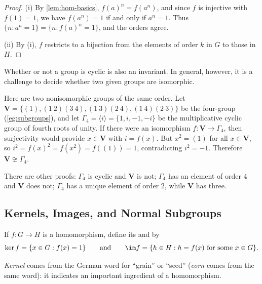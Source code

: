 \begin{proof}
	(i) By \autoref{lem:hom-basics}, \(f(a)^n = f(a^n)\), and since \(f\) is injective
	with \(f(1) = 1\), we have \(f(a^n) = 1\) if and only if \(a^n = 1\). Thus
	\(\{n : a^n = 1\} = \{n : f(a)^n = 1\}\), and the orders agree.

	(ii) By (i), \(f\) restricts to a bijection from the elements of order \(k\) in \(G\) to
	those in \(H\).
\end{proof}

Whether or not a group is cyclic is also an invariant. In general, however, it is a
challenge to decide whether two given groups are isomorphic.

\begin{eg}\label{eg:V-not-Gamma4}
	Here are two nonisomorphic groups of the same order. Let
	\(\mathbf V = \{(1), (1\ 2)(3\ 4), (1\ 3)(2\ 4), (1\ 4)(2\ 3)\}\) be the four-group
	(\autoref{eg:subgroups}), and let \(\Gamma_4 = \langle i\rangle = \{1, i, -1, -i\}\) be
	the multiplicative cyclic group of fourth roots of unity. If there were an isomorphism
	\(f\colon \mathbf V \to \Gamma_4\), then surjectivity would provide \(x \in \mathbf V\)
	with \(i = f(x)\). But \(x^2 = (1)\) for all \(x \in \mathbf V\), so
	\(i^2 = f(x)^2 = f(x^2) = f((1)) = 1\), contradicting \(i^2 = -1\). Therefore
	\(\mathbf V \not\cong \Gamma_4\).

	There are other proofs: \(\Gamma_4\) is cyclic and \(\mathbf V\) is not; \(\Gamma_4\)
	has an element of order \(4\) and \(\mathbf V\) does not; \(\Gamma_4\) has a unique
	element of order \(2\), while \(\mathbf V\) has three.
\end{eg}

\subsection{Kernels, Images, and Normal Subgroups}

\begin{definition}
	If \(f\colon G \to H\) is a homomorphism, define its  and  by
	\[
		\ker f = \{x \in G : f(x) = 1\}
		\qquad\text{and}\qquad
		\im f = \{h \in H : h = f(x) \text{ for some } x \in G\}.
	\]
\end{definition}

\begin{note}
	\emph{Kernel} comes from the German word for ``grain'' or ``seed'' (\emph{corn} comes
	from the same word): it indicates an important ingredient of a homomorphism.
\end{note}

